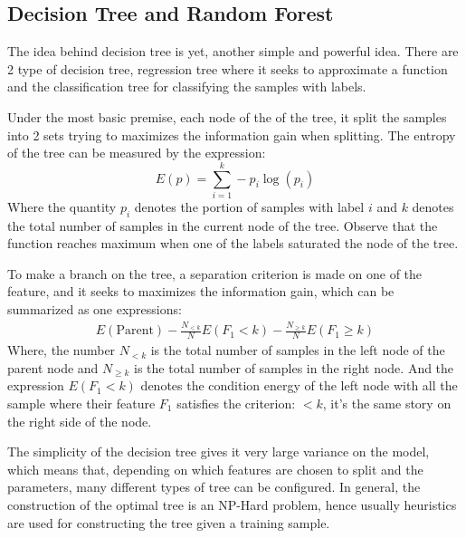 \documentclass{article}
\begin{document}
    \subsection*{Decision Tree and Random Forest}
        \hspace{1.1em}
        The idea behind decision tree is yet, another simple and powerful idea. There are 2 type of decision tree, regression tree where it seeks to approximate a function and the classification tree for classifying the samples with labels. 
        \par
        Under the most basic premise, each node of the of the tree, it split the samples into 2 sets trying to maximizes the information gain when splitting. The entropy of the tree can be measured by the expression: 
        \begin{equation*}\tag{9}\label{eqn:9}
            E(p) = \sum_{i = 1}^{k}-p_i\log(p_i)
        \end{equation*}
        Where the quantity $p_i$ denotes the portion of samples with label $i$ and $k$ denotes the total number of samples in the current node of the tree. Observe that the function reaches maximum when one of the labels saturated the node of the tree. 
        \par
        To make a branch on the tree, a separation criterion is made on one of the feature, and it seeks to maximizes the information gain, which can be summarized as one expressions: 
        \begin{align*}\tag{10}\label{eqn:10}
            E(\text{Parent}) -
            \frac{N_{<k}}{N}E(F_1 < k) - \frac{N_{\ge k}}{N}E(F_1\ge k)
        \end{align*}
        Where, the number $N_{<k}$ is the total number of samples in the left node of the parent node and $N_{\ge k}$ is the total number of samples in the right node. And the expression $E(F_1 < k)$ denotes the condition energy of the left node with all the sample where their feature $F_1$ satisfies the criterion: $<k$, it's the same story on the right side of the node. 
        \par
        The simplicity of the decision tree gives it very large variance on the model, which means that, depending on which features are chosen to split and the parameters, many different types of tree can be configured. In general, the construction of the optimal tree is an NP-Hard problem, hence usually heuristics are used for constructing the tree given a training sample. %
\end{document}
